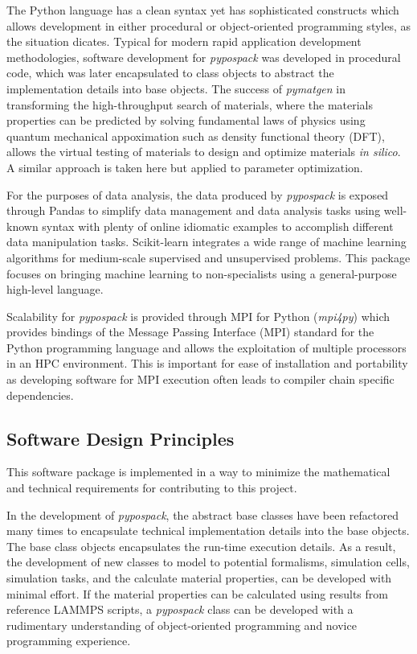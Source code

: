 The Python language has a clean syntax yet has sophisticated constructs which allows development in either procedural or object-oriented programming styles, as the situation dicates.  Typical for modern rapid application development methodologies, software development for \emph{pypospack} was developed in procedural code, which was later encapsulated to class objects to abstract the implementation details into base objects.  The success of \emph{pymatgen}\cite{ong2013_pymatgen} in transforming the high-throughput search of materials, where the materials properties can be predicted by solving fundamental laws of physics using quantum mechanical appoximation such as density functional theory (DFT), allows the virtual testing of materials to design and optimize materials \emph{in silico}.  A similar approach is taken here but applied to parameter optimization.

For the purposes of data analysis, the data produced by \emph{pypospack} is exposed through Pandas\cite{mckinney2010_pandas} to simplify data management and data analysis tasks using well-known syntax with plenty of online idiomatic examples to accomplish different data manipulation tasks.
Scikit-learn\cite{pedregosa2011_sklearn} integrates a wide range of machine learning algorithms for medium-scale supervised and unsupervised problems. This package focuses on bringing machine learning to non-specialists using a general-purpose high-level language.

Scalability for \emph{pypospack} is provided through MPI for Python (\emph{mpi4py})\cite{dalcin2005_mpi4py,dalcin2008_mpi4py} which provides bindings of the Message Passing Interface (MPI)\cite{mpi2015} standard for the Python programming language and allows the exploitation of multiple processors in an HPC environment.  This is important for ease of installation and portability as developing software for MPI execution often leads to compiler chain specific dependencies.

\subsection{Software Design Principles}

This software package is implemented in a way to minimize the mathematical and technical requirements for contributing to this project.

In the development of \emph{pypospack}, the abstract base classes have been refactored many times to encapsulate technical implementation details into the base objects.  The base class objects encapsulates the run-time execution details.  As a result, the development of new classes to model to potential formalisms, simulation cells, simulation tasks, and the calculate material properties, can be developed with minimal effort.  If the material properties can be calculated using results from reference LAMMPS scripts, a \emph{pypospack} class can be developed with a rudimentary understanding of object-oriented programming and novice programming experience.

